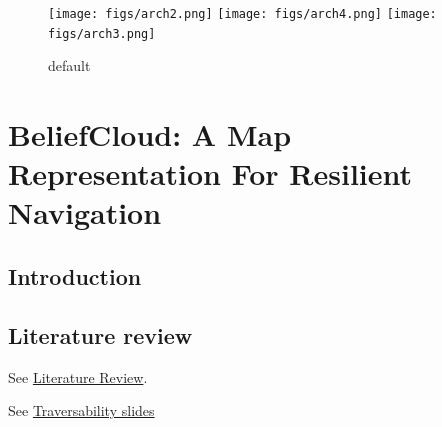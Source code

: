 \documentclass[letterpaper, 10 pt, conference]{ieeeconf}  %
\begin{document}
\begin{figure}[b]
\centering
\texttt{[image: figs/arch2.png]}\hfill
\texttt{[image: figs/arch4.png]}\hfill
\texttt{[image: figs/arch3.png]}
\caption{default}
\label{fig:figure3}
\end{figure}

\appendix

\section{BeliefCloud: A Map Representation For Resilient Navigation}
\subsection{Introduction}
\subsection{Literature review}
See \href{https://docs.google.com/spreadsheets/d/11qLnf_ezRuH9mCL2kmDWL4Jrx0DhV9FeSnF24StyZUg/edit#gid=0}{Literature Review}.

See \href{https://docs.google.com/presentation/d/1zdZJyG_-8uM9AR_wMzYOIBy0c8Eg1oV7gbKtXalEBA4/edit#slide=id.g5bf125e9db_6_5}{Traversability slides}
\end{document}
